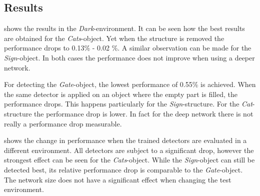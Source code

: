 \subsection{Results}

\begin{table}[hbtp]
	\centering
	
	\caption{Performance of two architectures when the test environment is similar to the training environment. Each trained network (row) is evaluated on each test set (column). It can be seen how the detectors exploit the structure that is placed in the object. In contrary, the detector of \acp{EWFO} only gets confused when the structure inside the object is very different from the training set.}
	\label{tab:all_basement}
\end{table}

 shows the results in the \textit{Dark}-environment. It can be seen how the best results are obtained for the \textit{Cats}-object. Yet when the structure is removed the performance drops to 0.13\% - 0.02 \%. A similar observation can be made for the \textit{Sign}-object. In both cases the performance does not improve when using a deeper network.

For detecting the \textit{Gate}-object, the lowest performance of 0.55\% is achieved. When the same detector is applied on an object where the empty part is filled, the performance drops. This happens particularly for the \textit{Sign}-structure. For the \textit{Cat}-structure the performance drop is lower. In fact for the deep network there is not really a performance drop measurable.

\begin{table}[hbtp]
	\centering
	
	\caption{Change in performance when the detectors are tested in another environment than their training environment. The most severe drop can be seen at the \textit{Cats}-object. The drop for \acp{EWFO} is comparable to the \textit{Sign}-object}
	\label{tab:diff_iros}
\end{table}

 shows the change in performance when the trained detectors are evaluated in a different environment. All detectors are subject to a significant drop, however the strongest effect can be seen for the \textit{Cats}-object. While the \textit{Sign}-object can still be detected best, its relative performance drop is comparable to the \textit{Gate}-object. The network size does not have a significant effect when changing the test environment.

